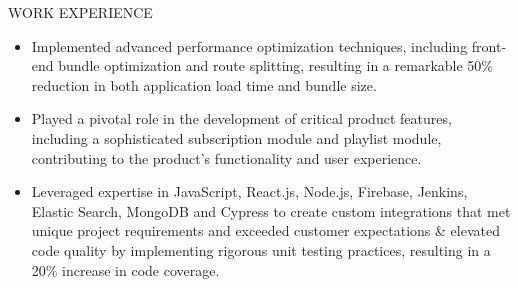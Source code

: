 \documentclass{resume} %
\begin{document}
\begin{rSection}{WORK EXPERIENCE}
   \begin{minipage}[t]{1\textwidth}
      \begin{itemize}[left=0pt, nosep, before=\vspace{-0.5\baselineskip}]
         \item \small Implemented advanced performance optimization techniques, including front-end bundle optimization and route splitting, resulting in a remarkable 50\% reduction in both application load time and bundle size.
         \item \small Played a pivotal role in the development of critical product features, including a sophisticated subscription module and playlist module, contributing to the product's functionality and user experience.
         \item \small Leveraged expertise in JavaScript, React.js, Node.js, Firebase, Jenkins, Elastic Search, MongoDB and Cypress to create custom integrations that met unique project requirements and exceeded customer expectations \& elevated code quality by implementing rigorous unit testing practices, resulting in a 20\% increase in code coverage. 
      \end{itemize}
   \end{minipage}

\end{rSection}
\end{document}
